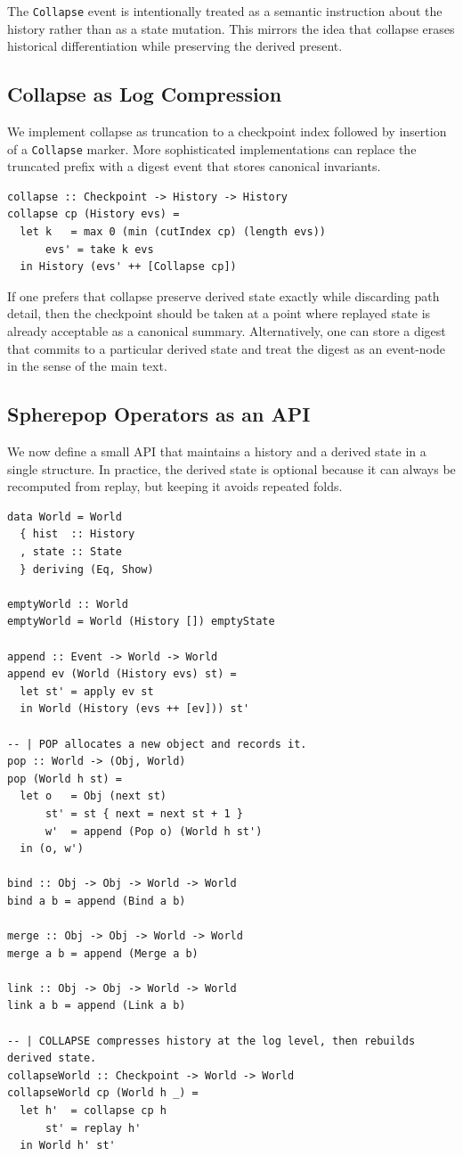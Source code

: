 \documentclass[11pt]{article}
\begin{document}
The \texttt{Collapse} event is intentionally treated as a semantic instruction
about the history rather than as a state mutation. This mirrors the idea that
collapse erases historical differentiation while preserving the derived present.

\subsection{Collapse as Log Compression}

We implement collapse as truncation to a checkpoint index followed by insertion
of a \texttt{Collapse} marker. More sophisticated implementations can replace
the truncated prefix with a digest event that stores canonical invariants.

\begin{verbatim}
collapse :: Checkpoint -> History -> History
collapse cp (History evs) =
  let k   = max 0 (min (cutIndex cp) (length evs))
      evs' = take k evs
  in History (evs' ++ [Collapse cp])
\end{verbatim}

If one prefers that collapse preserve derived state exactly while discarding
path detail, then the checkpoint should be taken at a point where replayed state
is already acceptable as a canonical summary. Alternatively, one can store a
digest that commits to a particular derived state and treat the digest as an
event-node in the sense of the main text.

\subsection{Spherepop Operators as an API}

We now define a small API that maintains a history and a derived state in a
single structure. In practice, the derived state is optional because it can
always be recomputed from replay, but keeping it avoids repeated folds.

\begin{verbatim}
data World = World
  { hist  :: History
  , state :: State
  } deriving (Eq, Show)

emptyWorld :: World
emptyWorld = World (History []) emptyState

append :: Event -> World -> World
append ev (World (History evs) st) =
  let st' = apply ev st
  in World (History (evs ++ [ev])) st'

-- | POP allocates a new object and records it.
pop :: World -> (Obj, World)
pop (World h st) =
  let o   = Obj (next st)
      st' = st { next = next st + 1 }
      w'  = append (Pop o) (World h st')
  in (o, w')

bind :: Obj -> Obj -> World -> World
bind a b = append (Bind a b)

merge :: Obj -> Obj -> World -> World
merge a b = append (Merge a b)

link :: Obj -> Obj -> World -> World
link a b = append (Link a b)

-- | COLLAPSE compresses history at the log level, then rebuilds derived state.
collapseWorld :: Checkpoint -> World -> World
collapseWorld cp (World h _) =
  let h'  = collapse cp h
      st' = replay h'
  in World h' st'
\end{verbatim}
\end{document}
